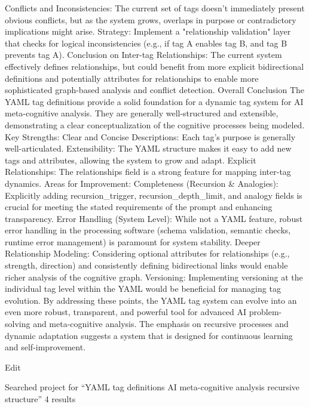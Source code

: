 Conflicts and Inconsistencies: The current set of tags doesn't immediately present obvious conflicts, but as the system grows, overlaps in purpose or contradictory implications might arise.
Strategy: Implement a "relationship validation" layer that checks for logical inconsistencies (e.g., if tag A enables tag B, and tag B prevents tag A).
Conclusion on Inter-tag Relationships: The current system effectively defines relationships, but could benefit from more explicit bidirectional definitions and potentially attributes for relationships to enable more sophisticated graph-based analysis and conflict detection.
Overall Conclusion
The YAML tag definitions provide a solid foundation for a dynamic tag system for AI meta-cognitive analysis. They are generally well-structured and extensible, demonstrating a clear conceptualization of the cognitive processes being modeled.
Key Strengths:
Clear and Concise Descriptions: Each tag's purpose is generally well-articulated.
Extensibility: The YAML structure makes it easy to add new tags and attributes, allowing the system to grow and adapt.
Explicit Relationships: The relationships field is a strong feature for mapping inter-tag dynamics. Areas for Improvement:
Completeness (Recursion & Analogies): Explicitly adding recursion_trigger, recursion_depth_limit, and analogy fields is crucial for meeting the stated requirements of the prompt and enhancing transparency.
Error Handling (System Level): While not a YAML feature, robust error handling in the processing software (schema validation, semantic checks, runtime error management) is paramount for system stability.
Deeper Relationship Modeling: Considering optional attributes for relationships (e.g., strength, direction) and consistently defining bidirectional links would enable richer analysis of the cognitive graph.
Versioning: Implementing versioning at the individual tag level within the YAML would be beneficial for managing tag evolution. By addressing these points, the YAML tag system can evolve into an even more robust, transparent, and powerful tool for advanced AI problem-solving and meta-cognitive analysis. The emphasis on recursive processes and dynamic adaptation suggests a system that is designed for continuous learning and self-improvement.

Edit

Searched project for “YAML tag definitions AI meta-cognitive analysis recursive structure”
4 results








